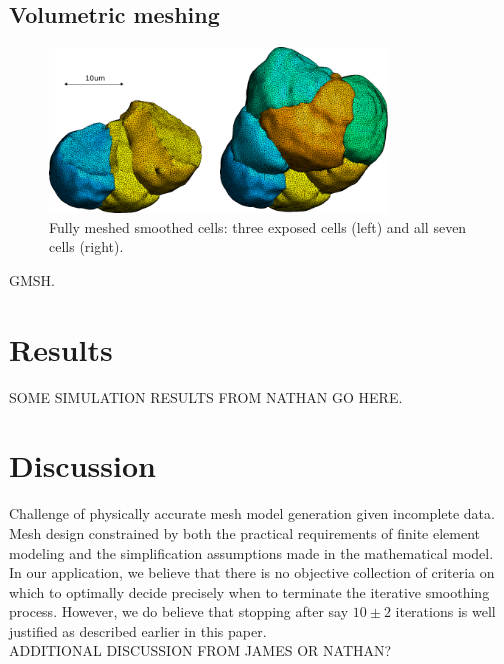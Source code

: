 \documentclass[a4paper,10pt]{article}
\begin{document}
\subsection{Volumetric meshing}

\begin{figure}[H]
\begin{center}
\includegraphics[width=0.8\textwidth]{images/smooth.pdf}
\end{center}
\caption{Fully meshed smoothed cells: three exposed cells (left) and all seven cells (right).}
\label{fig:smooth}
\end{figure}

GMSH.\\

\section{Results}

SOME SIMULATION RESULTS FROM NATHAN GO HERE.\\

\section{Discussion}

Challenge of physically accurate mesh model generation given incomplete data.\\
Mesh design constrained by both the practical requirements of finite element modeling and the simplification assumptions made in the mathematical model.\\ 
In our application, we believe that there is no objective collection of criteria on which to optimally decide precisely when to terminate the iterative smoothing process. However, we do believe that stopping after say $10\pm2$ iterations is well justified as described earlier in this paper.\\
ADDITIONAL DISCUSSION FROM JAMES OR NATHAN?\\
\end{document}
